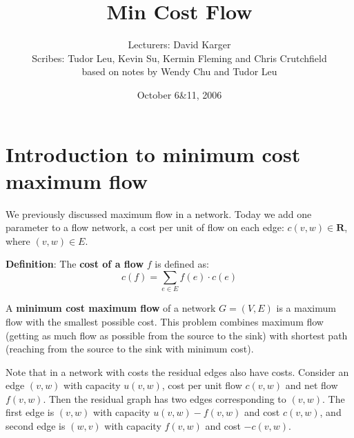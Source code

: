 \documentclass{article}
\title{Min Cost Flow}
\date{October 6\&11, 2006}
\author{Lecturers: David Karger\\ Scribes: Tudor Leu, Kevin Su, Kermin Fleming and Chris Crutchfield\\ based on notes by Wendy Chu and Tudor Leu}
\begin{document}
%
%
%
%

%




\section{Introduction to minimum cost maximum flow}

We previously discussed maximum flow in a network. Today we add one parameter to a flow network, a cost per unit of flow on each edge: $c(v, w) \in \mathbf{R}$, where $(v, w) \in E$.

\textbf{Definition}:
    The {\bf cost of a flow} $f$ is defined as:
\begin{displaymath}
c(f) = \sum_{e \in E} f(e)\cdot c(e)
\end{displaymath}

A {\bf minimum cost maximum flow} of a network $G=(V, E)$ is a maximum flow with the smallest possible cost. This problem combines maximum flow (getting as much flow as possible from the source to the sink) with shortest path (reaching from the source to the sink with minimum cost). 

Note that in a network with costs the residual edges also have costs. Consider an edge $(v, w)$ with capacity $u(v, w)$, cost per unit flow $c(v, w)$ and net flow $f(v, w)$. Then the residual graph has two edges corresponding to $(v, w)$. The first edge is $(v, w)$ with capacity $u(v, w) - f(v, w)$ and cost $c(v, w)$, and second edge is $(w, v)$ with capacity $f(v, w)$ and cost $-c(v, w)$. 
\end{document}
